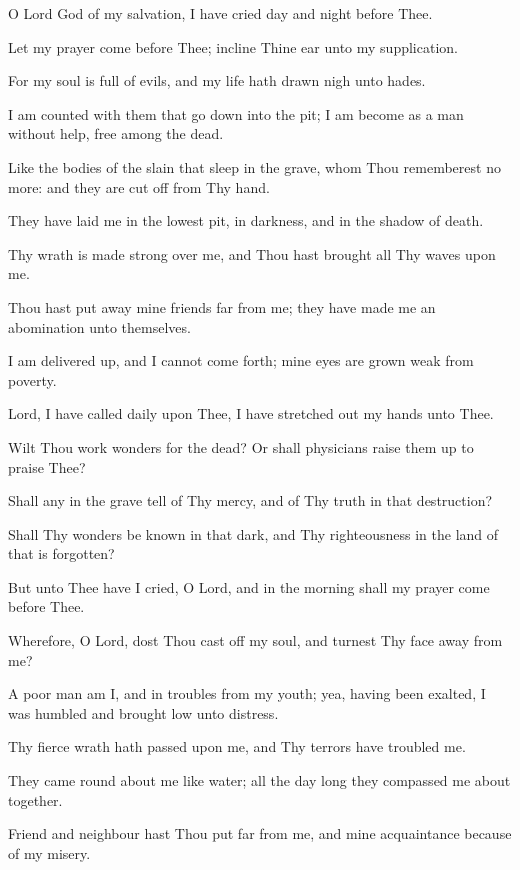 O Lord God of my salvation, I have cried day and night before Thee.

Let my prayer come before Thee; incline Thine ear unto my supplication.

For my soul is full of evils, and my life hath drawn nigh unto hades.

I am counted with them that go down into the pit; I am become as a man without help, free among the dead.

Like the bodies of the slain that sleep in the grave, whom Thou rememberest no more: and they are cut off from Thy hand.

They have laid me in the lowest pit, in darkness, and in the shadow of death.

Thy wrath is made strong over me, and Thou hast brought all Thy waves upon me.

Thou hast put away mine friends far from me; they have made me an abomination unto themselves.

I am delivered up, and I cannot come forth; mine eyes are grown weak from poverty.

Lord, I have called daily upon Thee, I have stretched out my hands unto Thee.

Wilt Thou work wonders for the dead? Or shall physicians raise them up to praise Thee?

Shall any in the grave tell of Thy mercy, and of Thy truth in that destruction?

Shall Thy wonders be known in that dark, and Thy righteousness in the land of that is forgotten?

But unto Thee have I cried, O Lord, and in the morning shall my prayer come before Thee.

Wherefore, O Lord, dost Thou cast off my soul, and turnest Thy face away from me?

A poor man am I, and in troubles from my youth; yea, having been exalted, I was humbled and brought low unto distress.

Thy fierce wrath hath passed upon me, and Thy terrors have troubled me.

They came round about me like water; all the day long they compassed me about together.

Friend and neighbour hast Thou put far from me, and mine acquaintance because of my misery.
